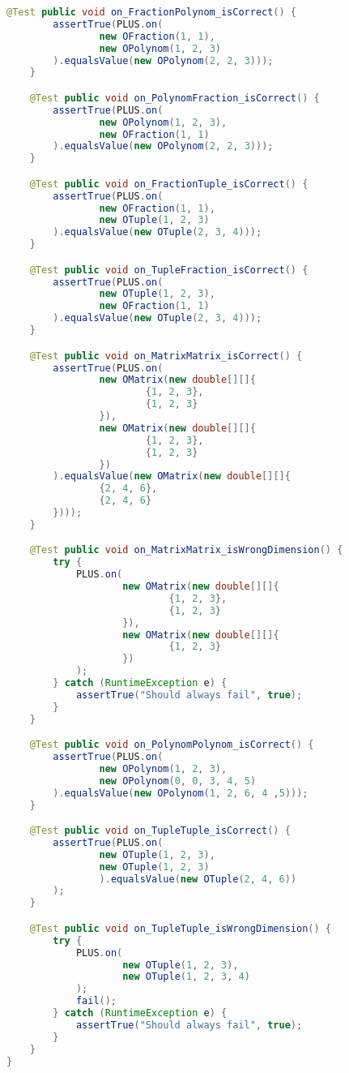 \begin{lstlisting}[caption=PlusTest (Falk),label=list:PlusTest,language=Java]
    @Test public void on_FractionPolynom_isCorrect() {
        assertTrue(PLUS.on(
                new OFraction(1, 1),
                new OPolynom(1, 2, 3)
        ).equalsValue(new OPolynom(2, 2, 3)));
    }

    @Test public void on_PolynomFraction_isCorrect() {
        assertTrue(PLUS.on(
                new OPolynom(1, 2, 3),
                new OFraction(1, 1)
        ).equalsValue(new OPolynom(2, 2, 3)));
    }

    @Test public void on_FractionTuple_isCorrect() {
        assertTrue(PLUS.on(
                new OFraction(1, 1),
                new OTuple(1, 2, 3)
        ).equalsValue(new OTuple(2, 3, 4)));
    }

    @Test public void on_TupleFraction_isCorrect() {
        assertTrue(PLUS.on(
                new OTuple(1, 2, 3),
                new OFraction(1, 1)
        ).equalsValue(new OTuple(2, 3, 4)));
    }

    @Test public void on_MatrixMatrix_isCorrect() {
        assertTrue(PLUS.on(
                new OMatrix(new double[][]{
                        {1, 2, 3},
                        {1, 2, 3}
                }),
                new OMatrix(new double[][]{
                        {1, 2, 3},
                        {1, 2, 3}
                })
        ).equalsValue(new OMatrix(new double[][]{
                {2, 4, 6},
                {2, 4, 6}
        })));
    }

    @Test public void on_MatrixMatrix_isWrongDimension() {
        try {
            PLUS.on(
                    new OMatrix(new double[][]{
                            {1, 2, 3},
                            {1, 2, 3}
                    }),
                    new OMatrix(new double[][]{
                            {1, 2, 3}
                    })
            );
        } catch (RuntimeException e) {
            assertTrue("Should always fail", true);
        }
    }

    @Test public void on_PolynomPolynom_isCorrect() {
        assertTrue(PLUS.on(
                new OPolynom(1, 2, 3),
                new OPolynom(0, 0, 3, 4, 5)
        ).equalsValue(new OPolynom(1, 2, 6, 4 ,5)));
    }

    @Test public void on_TupleTuple_isCorrect() {
        assertTrue(PLUS.on(
                new OTuple(1, 2, 3),
                new OTuple(1, 2, 3)
                ).equalsValue(new OTuple(2, 4, 6))
        );
    }

    @Test public void on_TupleTuple_isWrongDimension() {
        try {
            PLUS.on(
                    new OTuple(1, 2, 3),
                    new OTuple(1, 2, 3, 4)
            );
            fail();
        } catch (RuntimeException e) {
            assertTrue("Should always fail", true);
        }
    }
}
\end{lstlisting}

